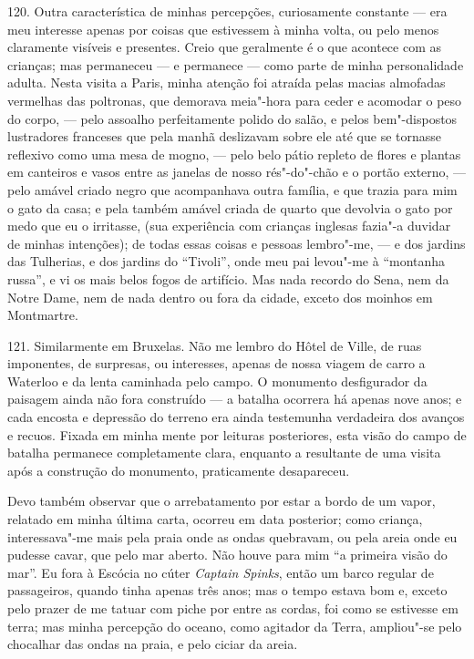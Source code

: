 120. Outra característica de minhas percepções, curiosamente constante
--- era meu interesse apenas por coisas que estivessem à minha volta, ou
pelo menos claramente visíveis e presentes. Creio que geralmente é o que
acontece com as crianças; mas permaneceu --- e permanece --- como parte de
minha personalidade adulta. Nesta visita a Paris, minha atenção foi
atraída pelas macias almofadas vermelhas das poltronas, que demorava
meia"-hora para ceder e acomodar o peso do corpo, --- pelo assoalho
perfeitamente polido do salão, e pelos bem"-dispostos lustradores
franceses que pela manhã deslizavam sobre ele até que se tornasse
reflexivo como uma mesa de mogno, --- pelo belo pátio repleto de flores e
plantas em canteiros e vasos entre as janelas de nosso rés"-do"-chão e o
portão externo, --- pelo amável criado negro que acompanhava outra
família, e que trazia para mim o gato da casa; e pela também amável
criada de quarto que devolvia o gato por medo que eu o irritasse, (sua
experiência com crianças inglesas fazia"-a duvidar de minhas intenções);
de todas essas coisas e pessoas lembro"-me, --- e dos jardins das
Tulherias, e dos jardins do ``Tivoli'', onde meu pai levou"-me à
``montanha russa'', e vi os mais belos fogos de artifício. Mas nada
recordo do Sena, nem da Notre Dame, nem de nada dentro ou fora da
cidade, exceto dos moinhos em Montmartre.

121. Similarmente em Bruxelas. Não me lembro do Hôtel de Ville, de ruas
imponentes, de surpresas, ou interesses, apenas de nossa viagem de carro
a Waterloo e da lenta caminhada pelo campo. O monumento desfigurador da
paisagem ainda não fora construído --- a batalha ocorrera há apenas nove
anos; e cada encosta e depressão do terreno era ainda testemunha
verdadeira dos avanços e recuos. Fixada em minha mente por leituras
posteriores, esta visão do campo de batalha permanece completamente
clara, enquanto a resultante de uma visita após a construção do
monumento, praticamente desapareceu.

Devo também observar que o arrebatamento por estar a bordo de um vapor,
relatado em minha última carta, ocorreu em data posterior; como criança,
interessava"-me mais pela praia onde as ondas quebravam, ou pela areia
onde eu pudesse cavar, que pelo mar aberto. Não houve para mim ``a
primeira visão do mar''. Eu fora à Escócia no cúter \emph{Captain
Spinks}, então um barco regular de passageiros, quando tinha apenas três
anos; mas o tempo estava bom e, exceto pelo prazer de me tatuar com
piche por entre as cordas, foi como se estivesse em terra; mas minha
percepção do oceano, como agitador da Terra, ampliou"-se pelo chocalhar
das ondas na praia, e pelo ciciar da areia.

